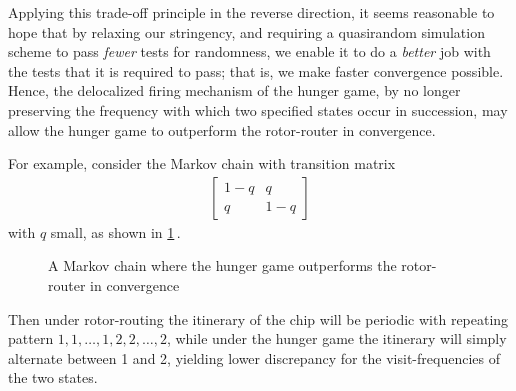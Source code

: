 Applying this trade-off principle in the reverse direction,
it seems reasonable to hope that by relaxing our stringency,
and requiring a quasirandom simulation scheme
to pass {\em fewer} tests for randomness,
we enable it to do a {\em better} job
with the tests that it is required to pass;
that is, we make faster convergence possible.
Hence, the delocalized firing mechanism of the hunger game,
by no longer preserving the frequency with which
two specified states occur in succession, may allow
the hunger game to outperform the rotor-router in convergence.

For example, consider the Markov chain with transition matrix
\begin{align*}
    \begin{bmatrix}
        1-q & q \\
        q & 1-q 
    \end{bmatrix}
\end{align*}
with $q$ small, as shown in \cref{fig: conclusion outperform}\,.
\begin{figure}[htbp]
    \centering
    \caption{A Markov chain where the hunger game outperforms the rotor-router in convergence}
    \label{fig: conclusion outperform}
\end{figure}
Then under rotor-routing the itinerary of the chip will be
periodic with repeating pattern $1,1,\dots,1,2,2,\dots,2$,
while under the hunger game the itinerary will simply alternate between 1 and 2,
yielding lower discrepancy for the visit-frequencies of the two states.

